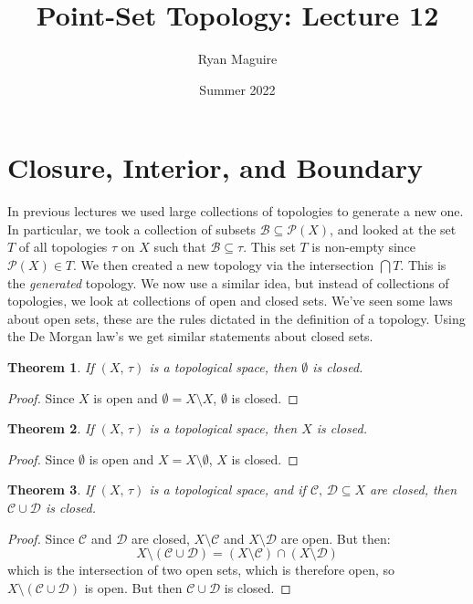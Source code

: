 \documentclass{article}
\title{Point-Set Topology: Lecture 12}
\author{Ryan Maguire}
\date{Summer 2022}
\theoremstyle{plain}
\newtheorem{theorem}{Theorem}[section]
\theoremstyle{normal}
\begin{document}
    \maketitle
    \section{Closure, Interior, and Boundary}
        In previous lectures we used large collections of topologies to
        generate a new one. In particular, we took a collection
        of subsets $\mathcal{B}\subseteq\mathcal{P}(X)$, and looked at the
        set $T$ of all topologies $\tau$ on $X$ such that
        $\mathcal{B}\subseteq\tau$. This set $T$ is non-empty since
        $\mathcal{P}(X)\in{T}$. We then created a new topology via the
        intersection $\bigcap{T}$. This is the \textit{generated} topology.
        We now use a similar idea, but instead of collections of topologies,
        we look at collections of open and closed sets. We've seen some laws
        about open sets, these are the rules dictated in the definition of a
        topology. Using the De Morgan law's we get similar statements about
        closed sets.
        \begin{theorem}
            If $(X,\,\tau)$ is a topological space, then $\emptyset$ is closed.
        \end{theorem}
        \begin{proof}
            Since $X$ is open and $\emptyset=X\setminus{X}$, $\emptyset$ is
            closed.
        \end{proof}
        \begin{theorem}
            If $(X,\,\tau)$ is a topological space, then $X$ is closed.
        \end{theorem}
        \begin{proof}
            Since $\emptyset$ is open and $X=X\setminus\emptyset$, $X$ is
            closed.
        \end{proof}
        \begin{theorem}
            If $(X,\,\tau)$ is a topological space, and if
            $\mathcal{C},\,\mathcal{D}\subseteq{X}$ are closed, then
            $\mathcal{C}\cup\mathcal{D}$ is closed.
        \end{theorem}
        \begin{proof}
            Since $\mathcal{C}$ and $\mathcal{D}$ are closed,
            $X\setminus\mathcal{C}$ and $X\setminus\mathcal{D}$ are open.
            But then:
            \begin{equation}
                X\setminus(\mathcal{C}\cup\mathcal{D})
                =(X\setminus\mathcal{C})\cap(X\setminus\mathcal{D})
            \end{equation}
            which is the intersection of two open sets, which is therefore open,
            so $X\setminus(\mathcal{C}\cup\mathcal{D})$ is open. But then
            $\mathcal{C}\cup\mathcal{D}$ is closed.
        \end{proof}
\end{document}
